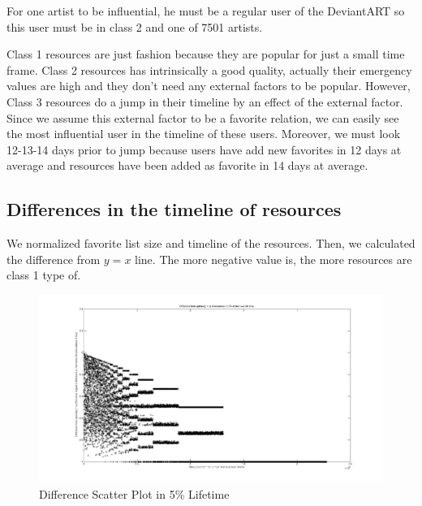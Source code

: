 \documentclass[12pt,a4paper]{report}
\begin{document}
	\par \hspace{0.6cm} For one artist to be influential, he must be a regular user of the DeviantART so this user must be in class 2 and one of 7501 artists.

	Class 1 resources are just fashion because they are popular for just a small time frame.  Class 2  resources has intrinsically  a good quality, actually their emergency values are high and they don't need any external factors to be popular. However, Class 3 resources do a jump in their timeline by an effect of the external factor. Since we assume this external factor to be a favorite relation, we can easily see the most influential user in the timeline of these users. Moreover, we must look 12-13-14 days prior to jump because users have add new favorites in 12 days at average and resources have been added as favorite in 14 days at average. \\

	\subsection{Differences in the timeline of resources}

	\par \hspace{0.6cm} We normalized favorite list size and timeline of the resources. Then, we calculated the difference from $y = x$ line. The more negative value is, the more resources are class 1 type of. \\

	\vspace{-5cm}
	\begin{figure}
	\hspace{-3.7cm}\includegraphics[width=200mm]{first.jpg}
	\caption{Difference Scatter Plot in 5\% Lifetime}
	\end{figure}
\end{document}
